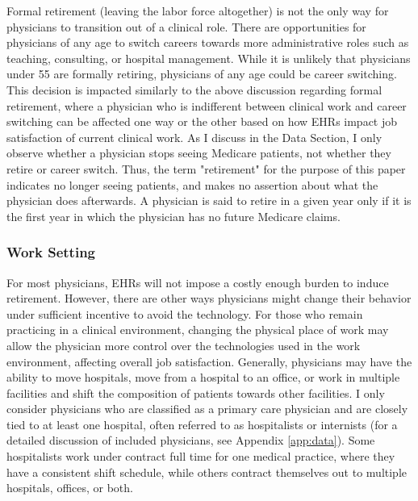 \documentclass[12pt]{article}
\begin{document}
Formal retirement (leaving the labor force altogether) is not the only way for physicians to transition out of a clinical role. There are opportunities for physicians of any age to switch careers towards more administrative roles such as teaching, consulting, or hospital management. While it is unlikely that physicians under 55 are formally retiring, physicians of any age could be career switching. This decision is impacted similarly to the above discussion regarding formal retirement, where a physician who is indifferent between clinical work and career switching can be affected one way or the other based on how EHRs impact job satisfaction of current clinical work. As I discuss in the Data Section, I only observe whether a physician stops seeing Medicare patients, not whether they retire or career switch. Thus, the term "retirement" for the purpose of this paper indicates no longer seeing patients, and makes no assertion about what the physician does afterwards. A physician is said to retire in a given year only if it is the first year in which the physician has no future Medicare claims.



\subsubsection{Work Setting}

For most physicians, EHRs will not impose a costly enough burden to induce retirement. However, there are other ways physicians might change their behavior under sufficient incentive to avoid the technology. For those who remain practicing in a clinical environment, changing the physical place of work may allow the physician more control over the technologies used in the work environment, affecting overall job satisfaction. Generally, physicians may have the ability to move hospitals, move from a hospital to an office, or work in multiple facilities and shift the composition of patients towards other facilities. I only consider physicians who are classified as a primary care physician and are closely tied to at least one hospital, often referred to as hospitalists or internists (for a detailed discussion of included physicians, see Appendix \ref{app:data}). Some hospitalists work under contract full time for one medical practice, where they have a consistent shift schedule, while others contract themselves out to multiple hospitals, offices, or both. 
\end{document}
